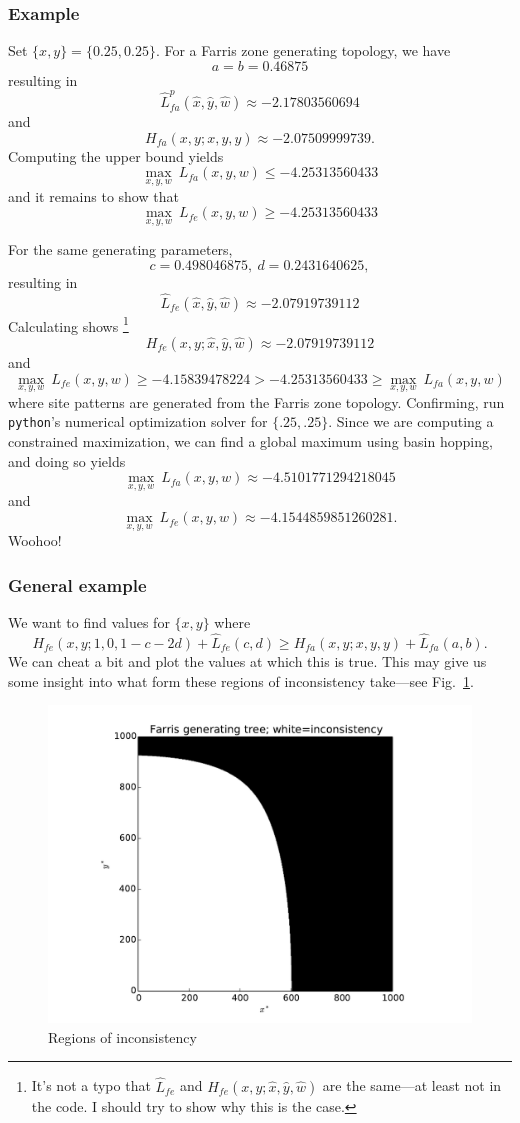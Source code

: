 \documentclass[a4paper]{article}
\begin{document}
\subsubsection{Example}

Set $\{x, y\} = \{0.25, 0.25\}$.
For a Farris zone generating topology, we have
$$
a = b = 0.46875
$$
resulting in
$$
\hat{L}_{fa}^{p}(\hat{x}, \hat{y}, \hat{w}) \approx -2.17803560694
$$
and
$$
H_{fa}(x,y;x,y,y) \approx -2.07509999739.
$$
Computing the upper bound yields
$$
\max_{x,y,w} \ L_{fa}(x,y,w) \le -4.25313560433
$$
and it remains to show that 
$$
\max_{x,y,w} \ L_{fe}(x,y,w) \ge -4.25313560433
$$

For the same generating parameters,
$$
c = 0.498046875, \ d = 0.2431640625,
$$
resulting in
$$
\hat{L}_{fe}(\hat{x}, \hat{y}, \hat{w}) \approx -2.07919739112
$$
Calculating shows%
    \footnote{It's not a typo that $\hat{L}_{fe}$ and $H_{fe}(x,y; \hat{x}, \hat{y}, \hat{w})$ are the same---at least not in the code.
        I should try to show why this is the case.
        }
$$
H_{fe}(x,y; \hat{x}, \hat{y}, \hat{w}) \approx -2.07919739112
$$
and
$$
\max_{x,y,w} \ L_{fe}(x,y,w) \ge -4.15839478224 > -4.25313560433 \ge \max_{x,y,w} \ L_{fa}(x,y,w)
$$
where site patterns are generated from the Farris zone topology.
Confirming, run \texttt{python}'s numerical optimization solver for $\{.25, .25\}$.
Since we are computing a constrained maximization, we can find a global maximum using basin hopping, and doing so yields
$$
\max_{x,y,w} \ L_{fa}(x,y,w) \approx -4.5101771294218045
$$
and
$$
\max_{x,y,w} \ L_{fe}(x,y,w) \approx -4.1544859851260281.
$$
Woohoo!

\subsubsection{General example}

We want to find values for $\{x,y\}$ where
$$
H_{fe}(x,y; 1, 0, 1-c-2d) + \hat{L}_{fe}(c,d) \ge H_{fa}(x,y; x, y, y) + \hat{L}_{fa}(a,b).
$$
We can cheat a bit and plot the values at which this is true.
This may give us some insight into what form these regions of inconsistency take---see Fig.~\ref{fig:inconsistency-farris}.

\begin{figure}
\centering
\includegraphics[width=.9\textwidth]{ineqs-max-far-gen}
\caption{Regions of inconsistency}
\label{fig:inconsistency-farris}
\end{figure}



\end{document}
